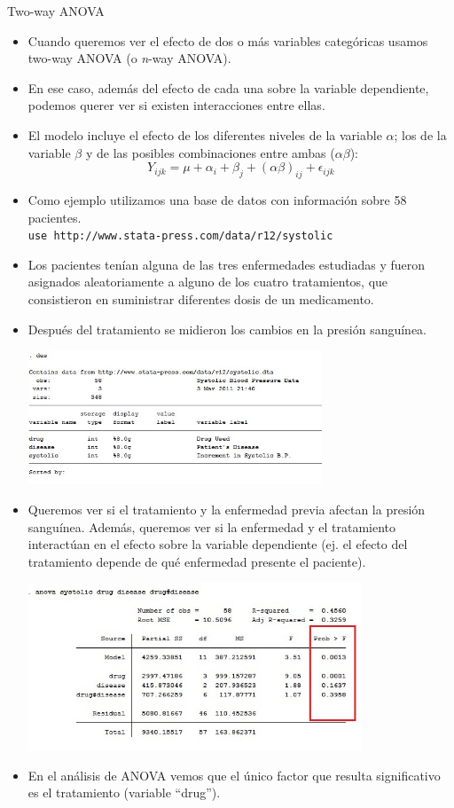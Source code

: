 \documentclass{beamer}
\begin{document}
\begin{frame}[allowframebreaks]{Two-way ANOVA}
\begin{itemize}
\item Cuando queremos ver el efecto de dos o más variables categóricas usamos two-way ANOVA (o \textit{n}-way ANOVA).
\item En ese  caso, además del efecto de cada una sobre la variable dependiente, podemos querer ver si existen interacciones entre ellas.
\item El modelo incluye el efecto de los diferentes niveles de la variable $\alpha$; los de la variable $\beta$ y de las posibles combinaciones entre ambas ($\alpha\beta$):
\begin{displaymath}
Y_{ijk}= \mu + \alpha_{i} + \beta_{j} + (\alpha\beta)_{ij} + \epsilon_{ijk}
\end{displaymath}
\item Como ejemplo utilizamos una base de datos con información sobre 58 pacientes.\\
\footnotesize{\texttt{use http://www.stata-press.com/data/r12/systolic}}\\
\item Los pacientes tenían alguna de las tres enfermedades estudiadas y fueron asignados aleatoriamente a alguno de los cuatro tratamientos, que consistieron en suministrar diferentes dosis de un medicamento. 
\item Después del tratamiento se midieron los cambios en la presión sanguínea.  
\begin{center}
\includegraphics[height=4cm]{twoway.jpg}
\end{center}
\item Queremos ver si el tratamiento y la enfermedad previa afectan la presión sanguínea. Además, queremos ver si la enfermedad y el tratamiento interactúan en el efecto sobre la variable dependiente (ej. el efecto del tratamiento depende de qué enfermedad presente el paciente).
\begin{center}
\includegraphics[height=5cm]{twoway1.jpg}
\end{center}
\item En el análisis de ANOVA vemos que el único factor que resulta significativo es el tratamiento (variable ``drug'').
\end{itemize}
\end{frame}
\end{document}
